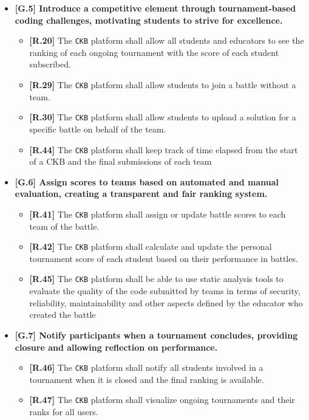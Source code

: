 \begin{itemize}
        \item \textbf{{[G.5]} Introduce a competitive element through tournament-based coding challenges, motivating students to strive for excellence. }
        \begin{itemize}
            \item \textbf{[R.20]} The \verb|CKB| platform shall allow all students and educators to see the ranking of each ongoing tournament with the score of each student subscribed.
            \item \textbf{[R.29]} The \verb|CKB| platform shall allow students to join a battle without a team.
            \item \textbf{[R.30]} The \verb|CKB| platform shall allow students to upload a solution for a specific battle on behalf of the team. 
            \item \textbf{[R.44]} The \verb|CKB| platform shall keep track of time elapsed from the start of a CKB and the final submissions of each team
        \end{itemize}

        \item \textbf{{[G.6]} Assign scores to teams based on automated and manual evaluation, creating a transparent and fair ranking system. }
        \begin{itemize}
            \item \textbf{[R.41]} The \verb|CKB| platform shall assign or update battle scores to each team of the battle.
            \item \textbf{[R.42]} The \verb|CKB| platform shall calculate and update the personal tournament score of each student based on their performance in battles.
            \item \textbf{[R.45]} The \verb|CKB| platform shall be able to use static analysis tools to evaluate the quality of the code submitted by teams in terms of security, reliability, maintainability and other aspects defined by the educator who created the battle
        \end{itemize}

        \item \textbf{{[G.7]} Notify participants when a tournament concludes, providing closure and allowing reflection on performance. }
        \begin{itemize}
            \item \textbf{[R.46]} The \verb|CKB| platform shall notify all students involved in a tournament when it is closed and the final ranking is available.   
            \item \textbf{[R.47]} The \verb|CKB| platform shall visualize ongoing tournaments and their ranks for all users. 
        \end{itemize}


\end{itemize}
